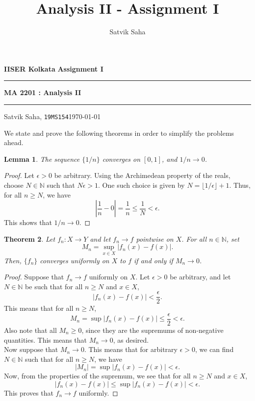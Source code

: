 \documentclass[10pt]{article}
\title{Analysis II - Assignment I}
\author{Satvik Saha}
\date{}
\def\N{\mathbb{N}}
\newtheorem{theorem}{Theorem}
\newtheorem{lemma}[theorem]{Lemma}
\begin{document}
    \par\textbf{IISER Kolkata} \hfill \textbf{Assignment I}
    \vspace{3pt}
    \hrule
    \vspace{3pt}
    \begin{center}
            \LARGE{\textbf{MA 2201 : Analysis II}}
    \end{center}
    \vspace{3pt}
    \hrule
    \vspace{3pt}
    Satvik Saha, \texttt{19MS154}\hfill\today
    \vspace{20pt}

    We state and prove the following theorems in order to simplify the problems
    ahead.
    
    \begin{lemma}
        The sequence $\{1 / n\}$ converges on $[0, 1]$, and $1 / n \to 0$.
    \end{lemma}
    \begin{proof}
        Let $\epsilon > 0$ be arbitrary. Using the Archimedean property of the
        reals, choose $N \in \N$ such that $N \epsilon > 1$. One such choice is
        given by $N = \lfloor 1 / \epsilon\rfloor + 1$. Thus, for all $n \geq N$, we
        have \[
            \left| \frac{1}{n} - 0 \right| = \frac{1}{n} \leq \frac{1}{N} < \epsilon.
        \] This shows that $1 / n \to 0$.
    \end{proof}
    \begin{theorem}
        Let $f_n\colon X \to Y$ and let $f_n \to f$ pointwise on $X$. 
        For all $n \in \N$, set \[
            M_n = \sup_{x \in X} |f_n(x) - f(x)|.
        \]
        Then, $\{f_n\}$ converges uniformly on $X$ to $f$ if and only if $M_n \to
        0$.
    \end{theorem}
    \begin{proof}
        Suppose that $f_n \to f$ uniformly on $X$.
        Let $\epsilon > 0$ be arbitrary, and let $N \in \N$ be such that
        for all $n \geq N$ and $x \in X$, \[
            |f_n(x) - f(x)| < \frac{\epsilon}{2}.
        \]
        This means that for all $n \geq N$, \[
            M_n = \sup |f_n(x) - f(x)| \leq \frac{\epsilon}{2} < \epsilon.
        \]
        Also note that all $M_n \geq 0$, since they are the supremums of non-negative
        quantities.
        This means that $M_n \to 0$, as desired. \\

        Now suppose that $M_n \to 0$. This means that for arbitrary $\epsilon > 0$,
        we can find $N \in \N$ such that for all $n \geq N$, we have \[
            |M_n| = \sup |f_n(x) - f(x)| < \epsilon.
        \] 
        Now, from the properties of the supremum, we see that for all $n \geq N$ and
        $x \in X$, \[
            |f_n(x) - f(x)| \leq \sup |f_n(x) - f(x)| < \epsilon.
        \] 
        This proves that $f_n \to f$ uniformly.
    \end{proof} 
    
\end{document}
